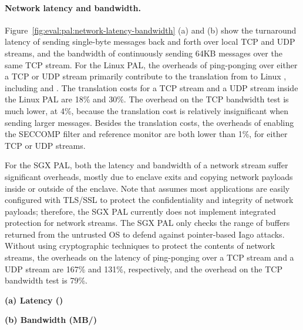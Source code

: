 




\paragraph{Network latency and bandwidth.}
Figure~\ref{fig:eval:pal:network-latency-bandwidth} (a) and (b) show the turnaround latency of sending single-byte messages back and forth over local TCP and UDP streams, and the bandwidth of continuously sending 64KB messages over the same TCP stream.
For the Linux PAL,
the overheads of ping-ponging over either a TCP or UDP stream primarily contribute to the translation from \hostapis{} to Linux \linuxapis{}, including  and .
The translation costs for a TCP stream and a UDP stream inside the Linux PAL are \roughly{}18\% and \roughly{}30\%.
The overhead on the TCP bandwidth test is much lower,
at \roughly{}4\%, because the translation cost is relatively insignificant when sending larger messages. 
Besides the translation costs, the overheads of enabling the SECCOMP filter and reference monitor are both lower than 1\%, for either TCP or UDP streams.


For the SGX PAL, both the latency and bandwidth of a network stream suffer significant overheads, mostly due to enclave exits and copying network payloads inside or outside of the enclave. Note that \graphenesgx{} assumes most applications are easily configured with TLS/SSL to protect the confidentiality and integrity of network payloads; therefore, the SGX PAL currently does not implement integrated protection for network streams. The SGX PAL only checks the range of buffers
returned from the untrusted OS
to defend against pointer-based Iago attacks.
Without using cryptographic techniques to protect the contents of network streams, the overheads on the latency of ping-ponging over a TCP stream and a UDP stream are \roughly{}167\% and \roughly{}131\%, respectively, and the overhead on the TCP bandwidth test is \roughly{}79\%. 

\begin{figure*}[t!]
\centering
\footnotesize
{}
\parbox{0.24\textwidth}{\quad}
\parbox{0.49\textwidth}{\centering\bf (a) Latency ({\usec})}
\parbox{0.24\textwidth}{\centering\bf (b) Bandwidth (MB/\asec{})}
\caption{(a) Latency of sending a short message over TCP and UDP sockets (lower is better), and (b) bandwidth of sending large data over TCP (higher is better).
The comparison is between (1)  and  on Linux; (2)  and  on a Linux PAL, with and without a SECCOMP filter ({\bf +SC}) and reference monitor ({\bf +RM}); (3)  and  on SGX PAL, without protection.}
\label{fig:eval:pal:network-latency-bandwidth}
\end{figure*}




